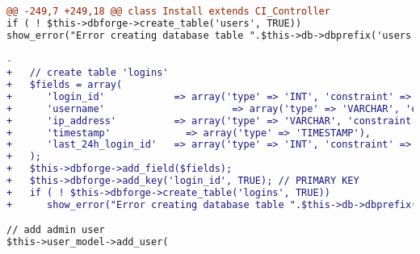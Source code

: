 \begin{lstlisting}[language=diff, caption=Perubahan kode program pada \textit{Install.php}, label=lst:9, basicstyle=\ttfamily, frame=single,
columns=fullflexible, keepspaces=true, breaklines=true]
@@ -249,7 +249,18 @@ class Install extends CI_Controller
if ( ! $this->dbforge->create_table('users', TRUE))
show_error("Error creating database table ".$this->db->dbprefix('users'));

-
+   // create table 'logins'
+   $fields = array(
+      'login_id'            => array('type' => 'INT', 'constraint' => 11, 'unsigned' => TRUE, 'auto_increment' => TRUE),
+      'username'                      => array('type' => 'VARCHAR', 'constraint' => 20),
+      'ip_address'          => array('type' => 'VARCHAR', 'constraint' => 15),
+      'timestamp'             => array('type' => 'TIMESTAMP'),
+      'last_24h_login_id'   => array('type' => 'INT', 'constraint' => 11, 'null' => TRUE),
+   );
+   $this->dbforge->add_field($fields);
+   $this->dbforge->add_key('login_id', TRUE); // PRIMARY KEY
+   if ( ! $this->dbforge->create_table('logins', TRUE))
+      show_error("Error creating database table ".$this->db->dbprefix('logins'));

// add admin user
$this->user_model->add_user(
\end{lstlisting}

